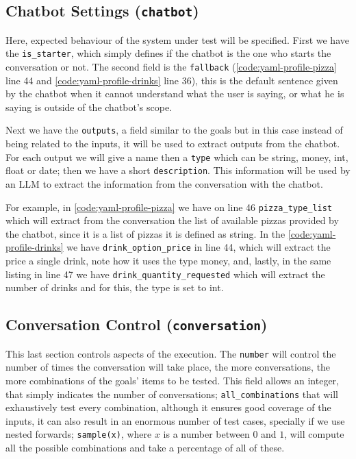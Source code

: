 \subsection{Chatbot Settings (\texttt{chatbot})}

Here, expected behaviour of the system under test will be specified.
First we have the \texttt{is\_starter},
which simply defines if the chatbot is the one who starts the conversation or not.
The second field is the \texttt{fallback}
(\autoref{code:yaml-profile-pizza} line 44
and \autoref{code:yaml-profile-drinks} line 36),
this is the default sentence given by the chatbot
when it cannot understand what the user is saying,
or what he is saying is outside of the chatbot's scope.

Next we have the \texttt{outputs}, a field similar to the goals
but in this case instead of being related to the inputs,
it will be used to extract outputs from the chatbot.
For each output we will give a name
then a \texttt{type} which can be string, money, int, float or date;
then we have a short \texttt{description}.
This information will be used by an \ac{LLM}
to extract the information from the conversation with the chatbot.

For example, in \autoref{code:yaml-profile-pizza} we have on line 46
\texttt{pizza\_type\_list} which will extract from the conversation
the list of available pizzas provided by the chatbot,
since it is a list of pizzas it is defined as string.
In the \autoref{code:yaml-profile-drinks} we have
\texttt{drink\_option\_price} in line 44,
which will extract the price a single drink,
note how it uses the type money,
and, lastly, in the same listing in line 47
we have \texttt{drink\_quantity\_requested}
which will extract the number of drinks
and for this, the type is set to int.


\subsection{Conversation Control (\texttt{conversation})}

This last section controls aspects of the execution.
The \texttt{number} will control the number of times the conversation will take place,
the more conversations, the more combinations of the goals' items to be tested.
This field allows an integer, that simply indicates the number of conversations;
\texttt{all\_combinations} that will exhaustively test every combination,
although it ensures good coverage of the inputs,
it can also result in an enormous number of test cases,
specially if we use nested forwards;
\texttt{sample(x)}, where $x$ is a number between $0$ and $1$,
will compute all the possible combinations
and take a percentage of all of these.


